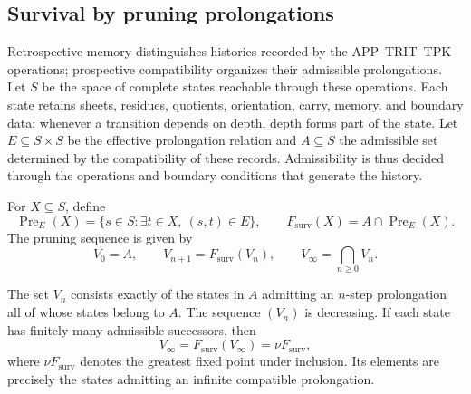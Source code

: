 \subsection{Survival by pruning prolongations}
\label{corpus9:xi:supervivencia}

Retrospective memory distinguishes histories recorded by the
APP--TRIT--TPK operations; prospective compatibility organizes their
admissible prolongations. Let \(S\) be the space of complete states
reachable through these operations. Each state retains sheets, residues,
quotients, orientation, carry, memory, and boundary data; whenever a
transition depends on depth, depth forms part of the state.
Let \(E\subseteq S\times S\) be the effective prolongation relation and
\(A\subseteq S\) the admissible set determined by the compatibility of
these records. Admissibility is thus decided through the operations and
boundary conditions that generate the history.

For \(X\subseteq S\), define
\begin{equation}
 \operatorname{Pre}_{E}(X)
 =\{s\in S:\exists t\in X,\ (s,t)\in E\},
 \qquad
 F_{\mathrm{surv}}(X)=A\cap\operatorname{Pre}_{E}(X).
 \label{corpus9:xi:operador-poda}
\end{equation}
The pruning sequence is given by
\begin{equation}
 V_0=A,\qquad
 V_{n+1}=F_{\mathrm{surv}}(V_n),\qquad
 V_\infty=\bigcap_{n\geq0}V_n.
 \label{corpus9:xi:sucesion-poda}
\end{equation}

\begin{proposition}
\label{corpus9:xi:mayor-punto-fijo}
The set \(V_n\) consists exactly of the states in \(A\) admitting an
\(n\)-step prolongation all of whose states belong to \(A\). The
sequence \((V_n)\) is decreasing. If each state has finitely many
admissible successors, then
\[
 V_\infty=F_{\mathrm{surv}}(V_\infty)
          =\nu F_{\mathrm{surv}},
\]
where \(\nu F_{\mathrm{surv}}\) denotes the greatest fixed point under
inclusion. Its elements are precisely the states admitting an infinite
compatible prolongation.
\end{proposition}

